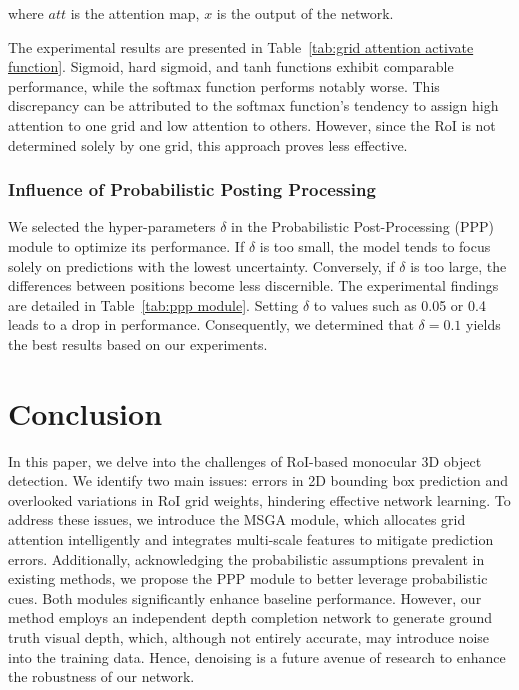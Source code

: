 \documentclass[journal]{IEEEtran}
\begin{document}
	where $att$ is the attention map, $x$ is the output of the network.
	
	The experimental results are presented in Table~\ref{tab:grid attention activate function}. Sigmoid, hard sigmoid, and tanh functions exhibit comparable performance, while the softmax function performs notably worse. This discrepancy can be attributed to the softmax function's tendency to assign high attention to one grid and low attention to others. However, since the RoI is not determined solely by one grid, this approach proves less effective.
	
	\subsubsection{Influence of Probabilistic Posting Processing}
	We selected the hyper-parameters $\delta$ in the Probabilistic Post-Processing (PPP) module to optimize its performance. If $\delta$ is too small, the model tends to focus solely on predictions with the lowest uncertainty. Conversely, if $\delta$ is too large, the differences between positions become less discernible. The experimental findings are detailed in Table~\ref{tab:ppp module}. Setting $\delta$ to values such as 0.05 or 0.4 leads to a drop in performance. Consequently, we determined that $\delta=0.1$ yields the best results based on our experiments.

	\section{Conclusion}\label{conclusion}
	In this paper, we delve into the challenges of RoI-based monocular 3D object detection. We identify two main issues: errors in 2D bounding box prediction and overlooked variations in RoI grid weights, hindering effective network learning. To address these issues, we introduce the MSGA module, which allocates grid attention intelligently and integrates multi-scale features to mitigate prediction errors. Additionally, acknowledging the probabilistic assumptions prevalent in existing methods, we propose the PPP module to better leverage probabilistic cues. Both modules significantly enhance baseline performance. However, our method employs an independent depth completion network to generate ground truth visual depth, which, although not entirely accurate, may introduce noise into the training data. Hence, denoising is a future avenue of research to enhance the robustness of our network.
\end{document}
